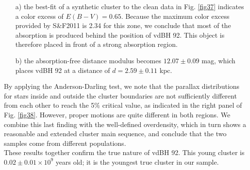 \documentclass[draft]{aa}
\begin{document}
\begin{itemize}
\item [a)] the best-fit of a synthetic cluster to the clean data in Fig. 
    \ref{fig37} indicates a color excess of $E(B-V)=0.65$. Because the
    maximum color excess provided by S\&F2011 is 2.34 for this zone, we
    conclude that most of the absorption is produced behind the position of
    vdBH 92. This object is therefore placed in front of a strong
    absorption region.
\item [b)] the absorption-free distance modulus becomes
$12.07\pm0.09$ mag, which places vdBH 92 at a distance of $d=2.59\pm0.11$ kpc.
\end{itemize}

By applying the Anderson-Darling test, we note that the parallax
distributions for stars inside and outside the cluster boundaries are not
sufficiently different from each other to reach the 5\% critical value, as
indicated in the right panel of Fig. \ref{fig38}. However, proper motions are
quite different in both regions. We combine this last finding with the well-defined overdensity, which in turn shows a reasonable and
extended cluster main sequence, and conclude that the two samples come from
different populations.\\

These results together confirm the true nature of vdBH 92. This
young cluster is $0.02\pm0.01\times10^9$ years old; it is the youngest true cluster
in our sample.
\end{document}
